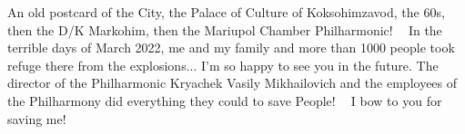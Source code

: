  
 
 
 
 

An old postcard of the City, the Palace of Culture of Koksohimzavod, the 60s, then the D/K Markohim, then the Mariupol Chamber Philharmonic! 💐🥰
In the terrible days of March 2022, me and my family and more than 1000 people took refuge there from the explosions... I'm so happy to see you in the future.
The director of the Philharmonic Kryachek Vasily Mikhailovich and the employees of the Philharmony did everything they could to save People! 💐🥰
I bow to you for saving me! 💐💐💐💐💐💐💐
